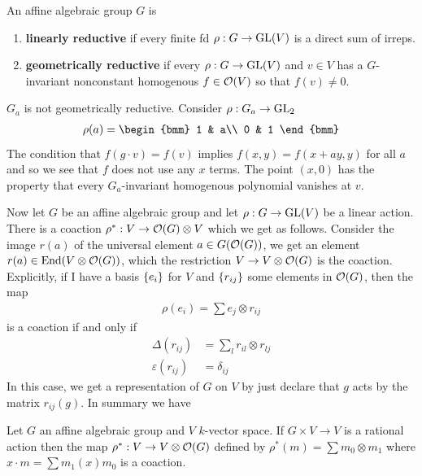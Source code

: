 \documentclass[12pt]{article}
\begin{document}
\begin{definition}
    An affine algebraic group $G$ is \begin{enumerate}
        \item \textbf{linearly reductive} if every finite fd $\rho:G\to\operatorname{GL}(V)$ is a direct sum of irreps.
        \item \textbf{geometrically reductive} if every $\rho:G\to \operatorname{GL}(V)$ and $v\in V$ has a $G$-invariant nonconstant homogenous $f\in \mathcal{O}(V)$ so that $f(v)\neq 0$.
        \end{enumerate}
\end{definition}
\begin{example} $G_a$ is not geometrically reductive. Consider $\rho:G_a\to \operatorname{GL}_2$
    \begin{align*}
        \rho(a) = \begin{bmm}
            1 & a\\
            0 & 1
        \end{bmm}
    \end{align*} The condition that $f(g\cdot v) = f(v)$ implies $f(x,y) = f(x+ay,y)$ for all $a$ and so we see that $f$ does not use any $x$ terms. The point $(x,0)$ has the property that every $G_a$-invariant homogenous polynomial vanishes at $v$. 
\end{example}
Now let $G$ be an affine algebraic group and let $\rho:G\to \operatorname{GL}(V)$ be a linear action. There is a coaction $\rho^*:V\to \mathcal{O}(G)\otimes V$ which we get as follows. Consider the image $r(a)$ of the universal element $a\in G(\mathcal{O}(G))$, we get an element $r(a) \in \operatorname{End}(V\otimes \mathcal{O}(G))$, which the restriction $V\to V\otimes \mathcal{O}(G)$ is the coaction. Explicitly, if I have a basis $\{e_i\}$ for $V$ and $\{r_{ij}\}$ some elements in $\mathcal{O}(G)$, then the map \begin{align*}
    \rho(e_i) = \sum e_j \otimes r_{ij}
\end{align*} is a coaction if and only if \begin{align*}
    \Delta(r_{ij}) &= \sum_{l} r_{il}\otimes r_{lj} \\
    \varepsilon(r_{ij}) &= \delta_{ij}
\end{align*} In this case, we get a representation of $G$ on $V$ by just declare that $g$ acts by the matrix $r_{ij}(g)$. In summary we have \begin{theorem}
    Let $G$ an affine algebraic group and $V$ $k$-vector space. If $G\times V\to V$ is a rational action then the map $\rho^*:V\to V\otimes \mathcal{O}(G)$ defined by $\rho^*(m) = \sum m_0\otimes m_1$ where $x\cdot m = \sum m_1(x)m_0$ is a coaction.
\end{theorem}
\end{document}
